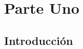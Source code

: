 \documentclass[11pt,fleqn]{book} %
\numberwithin{equation}{section} %
\numberwithin{figure}{section} %
\numberwithin{table}{section} %
\begin{document}




\pagestyle{empty} %

 \tableofcontents %

\cleardoublepage %

\pagestyle{fancy} %


\part{Parte Uno}



\chapter{Introducción}
\end{document}
